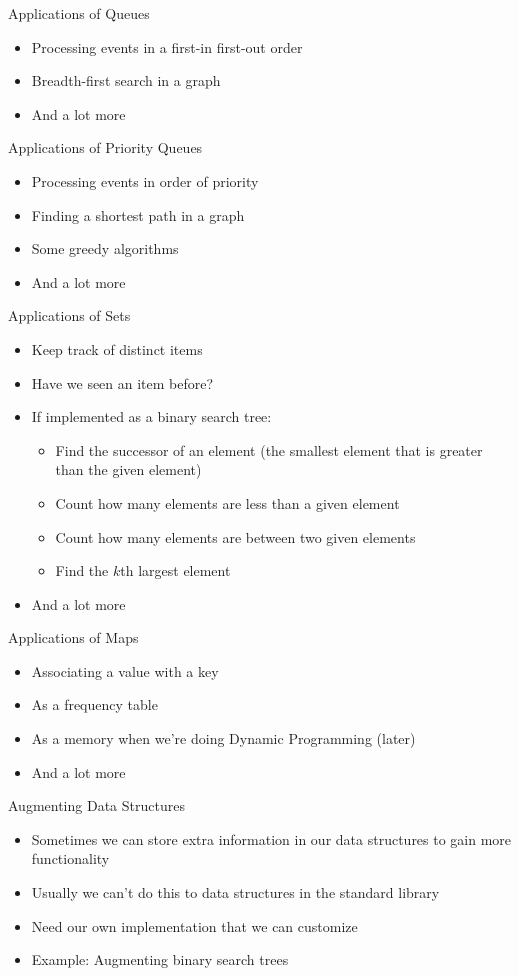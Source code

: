 \documentclass[12pt,t]{beamer}
\newcommand{\bi}{\begin{itemize}}
\newcommand{\ei}{\end{itemize}}
\begin{document}
\begin{frame}{Applications of Queues}
    \bi
        \item Processing events in a first-in first-out order
        \item Breadth-first search in a graph
        \item And a lot more
    \ei
\end{frame}

\begin{frame}{Applications of Priority Queues}
    \bi
        \item Processing events in order of priority
        \item Finding a shortest path in a graph
        \item Some greedy algorithms
        \item And a lot more
    \ei
\end{frame}

\begin{frame}{Applications of Sets}
    \bi
        \item Keep track of distinct items
        \item Have we seen an item before?
        \item If implemented as a binary search tree:
            \bi
        \item Find the successor of an element (the smallest element that is greater than the given element)
        \item Count how many elements are less than a given element
        \item Count how many elements are between two given elements
        \item Find the $k$th largest element
            \ei

        \item And a lot more
    \ei
\end{frame}

\begin{frame}{Applications of Maps}
    \bi
        \item Associating a value with a key
        \item As a frequency table
        \item As a memory when we're doing Dynamic Programming (later)
        \item And a lot more
    \ei
\end{frame}

\begin{frame}{Augmenting Data Structures}
    \bi
        \item Sometimes we can store extra information in our data structures to gain more functionality
        \item Usually we can't do this to data structures in the standard library
        \item Need our own implementation that we can customize
        \item Example: Augmenting binary search trees
    \ei
\end{frame}
\end{document}
